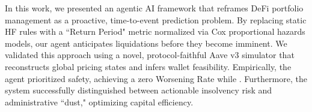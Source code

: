 \documentclass[manuscript,screen,review]{acmart}
\begin{document}
In this work, we presented an agentic AI framework that reframes DeFi portfolio management as a proactive, time-to-event prediction problem. By replacing static HF rules with a ``Return Period" metric normalized via Cox proportional hazards models, our agent anticipates liquidations before they become imminent. We validated this approach using a novel, protocol-faithful Aave v3 simulator that reconstructs global pricing states and infers wallet feasibility. Empirically, the agent prioritized safety, achieving a zero Worsening Rate while . Furthermore, the system successfully distinguished between actionable insolvency risk and administrative ``dust," optimizing capital efficiency.



\end{document}
